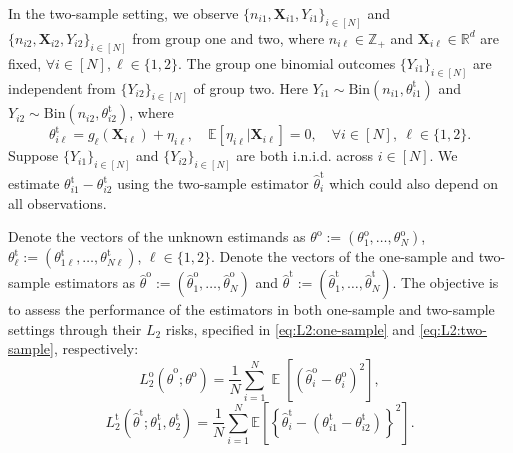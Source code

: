 \documentclass[12pt,letterpaper]{article}
\newcommand{\E}{\operatorname{\mathbb{E}}}
\begin{document}
In the two-sample setting, we observe $\{n_{i1},\mathbf{X}_{i1},Y_{i1}\}_{i\in[N]}$ and $\{n_{i2},\mathbf{X}_{i2},Y_{i2}\}_{i\in[N]}$ from group one and two, where $n_{i\ell}\in\mathbb{Z}_{+}$ and $\mathbf{X}_{i\ell}\in\mathbb{R}^d$ are fixed, $\forall i\in[N], \ell\in\{1,2\}$. The group one binomial outcomes $\{Y_{i1}\}_{i\in[N]}$ are independent from $\{Y_{i2}\}_{i\in[N]}$ of group two. Here $Y_{i1}\sim \mathrm{Bin}(n_{i1}, \theta_{i1}^{\textrm{t}})$ and $Y_{i2}\sim \mathrm{Bin}(n_{i2},\theta_{i2}^{\textrm{t}})$, where 
\begin{equation}\label{eq:depend:covariate:two-sample}
    \theta_{i\ell}^{\mathrm{t}}=g_{\ell}(\mathbf{X}_{i\ell})+\eta_{i\ell},\quad \mathbb{E}[\eta_{i\ell}|\mathbf{X}_{i\ell}]=0,\quad \forall i\in[N], \ \ell\in\{1,2\}.
\end{equation}
Suppose $\{Y_{i1}\}_{i\in[N]}$ and $\{Y_{i2}\}_{i\in[N]}$ are both i.n.i.d. across $i\in[N]$. We estimate $\theta_{i1}^{\textrm{t}}-\theta_{i2}^{\textrm{t}}$ using the two-sample estimator $\hat{\theta}_i^{\textrm{t}}$ which could also depend on all observations. 

Denote the vectors of the unknown estimands as $\theta^{\mathrm{o}} := (\theta_1^{\mathrm{o}}, \ldots, \theta_N^{\mathrm{o}})$, $\theta_{\ell}^{\mathrm{t}}:=(\theta_{1\ell}^{\mathrm{t}},\ldots,\theta_{N\ell}^{\mathrm{t}})$, $\ell\in\{1,2\}$. Denote the vectors of the one-sample and two-sample estimators as $\hat{\theta}^{\mathrm{o}} := (\hat{\theta}_1^{\mathrm{o}}, \ldots, \hat{\theta}_N^{\mathrm{o}})$ and $\hat{\theta}^{\mathrm{t}}:=(\hat{\theta}_1^{\mathrm{t}},\ldots,\hat{\theta}_N^{\mathrm{t}})$. The objective is to assess the performance of the estimators in both one-sample and two-sample settings through their $L_2$ risks, specified in \eqref{eq:L2:one-sample} and \eqref{eq:L2:two-sample}, respectively:
\begin{equation}\label{eq:L2:one-sample}
   L_{2}^{\mathrm{o}}\left(\hat{\theta}^{\mathrm{o}}; \theta^{\mathrm{o}}\right) = \frac{1}{N}\sum_{i=1}^{N} \E\left[\left(\hat{\theta}_i^{\mathrm{o}} - \theta_i^{\mathrm{o}}\right)^2\right],
\end{equation}
\begin{equation}\label{eq:L2:two-sample}
    L_2^{\mathrm{t}}\left(\hat{\theta}^{\mathrm{t}};\theta_1^{\mathrm{t}},\theta_2^{\mathrm{t}}\right)=\frac{1}{N}\sum_{i=1}^{N}\mathbb{E}\left[\left\{\hat{\theta}_i^{\mathrm{t}}-\left(\theta_{i1}^{\mathrm{t}}-\theta_{i2}^{\mathrm{t}}\right)\right\}^2\right].
\end{equation}
\end{document}
